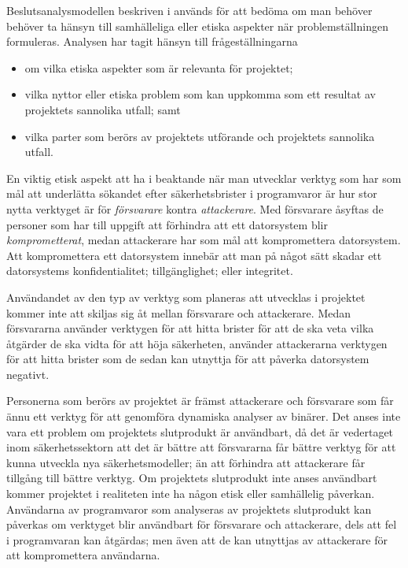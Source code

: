 Beslutsanalysmodellen beskriven i \cite{foreskrifter} används för att bedöma om man behöver behöver ta hänsyn till samhälleliga eller etiska aspekter när problemställningen formuleras.
Analysen har tagit hänsyn till frågeställningarna
\begin{itemize}
    \item om vilka etiska aspekter som är relevanta för projektet;
    \item vilka nyttor eller etiska problem som kan uppkomma som ett resultat av projektets sannolika utfall; samt
    \item vilka parter som berörs av projektets utförande och projektets sannolika utfall.
\end{itemize}

En viktig etisk aspekt att ha i beaktande när man utvecklar verktyg som har som mål att underlätta sökandet efter säkerhetsbrister i programvaror är hur stor nytta verktyget är för \emph{försvarare} kontra \emph{attackerare}.
Med försvarare åsyftas de personer som har till uppgift att förhindra att ett datorsystem blir \emph{komprometterat}, medan attackerare har som mål att kompromettera datorsystem.
Att kompromettera ett datorsystem innebär att man på något sätt skadar ett datorsystems konfidentialitet; tillgänglighet; eller integritet.

Användandet av den typ av verktyg som planeras att utvecklas i projektet kommer inte att skiljas sig åt mellan försvarare och attackerare.
Medan försvararna använder verktygen för att hitta brister för att de ska veta vilka åtgärder de ska vidta för att höja säkerheten, använder attackerarna verktygen för att hitta brister som de sedan kan utnyttja för att påverka datorsystem negativt.

Personerna som berörs av projektet är främst attackerare och försvarare som får ännu ett verktyg för att genomföra dynamiska analyser av binärer.
Det anses inte vara ett problem om projektets slutprodukt är användbart, då det är vedertaget inom säkerhetssektorn att det är bättre att försvararna får bättre verktyg för att kunna utveckla nya säkerhetsmodeller; än att förhindra att attackerare får tillgång till bättre verktyg.
Om projektets slutprodukt inte anses användbart kommer projektet i realiteten inte ha någon etisk eller samhällelig påverkan.
Användarna av programvaror som analyseras av projektets slutprodukt kan påverkas om verktyget blir användbart för försvarare och attackerare, dels att fel i programvaran kan åtgärdas; men även att de kan utnyttjas av attackerare för att kompromettera användarna.

